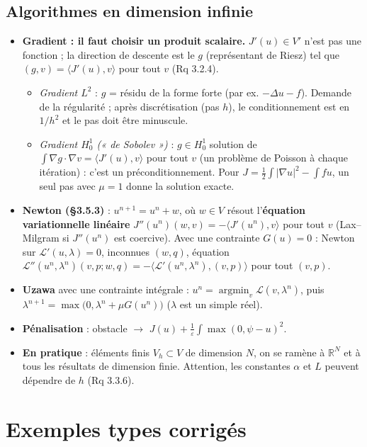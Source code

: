 \documentclass[10pt,a4paper]{article}
\newcommand{\R}{\mathbb{R}}
\newcommand{\sca}[2]{\langle #1,#2\rangle}
\newcommand{\eps}{\varepsilon}
\newcommand{\Lg}{\mathcal{L}}
\begin{document}
\subsection{Algorithmes en dimension infinie}\label{sec:algo}
\begin{itemize}
\item \textbf{Gradient : il faut choisir un produit scalaire.} $J'(u)\in V'$ n'est pas une fonction ; la direction de descente est le $g$ (représentant de Riesz) tel que $(g,v)=\sca{J'(u)}v$ pour tout $v$ (Rq 3.2.4).
\begin{itemize}
\item \emph{Gradient $L^2$} : $g$ = résidu de la forme forte (par ex. $-\Delta u-f$). Demande de la régularité ; après discrétisation (pas $h$), le conditionnement est en $1/h^2$ et le pas doit être minuscule.
\item \emph{Gradient $H^1_0$ (« de Sobolev »)} : $g\in H^1_0$ solution de $\int\nabla g\cdot\nabla v=\sca{J'(u)}v$ pour tout $v$ (un problème de Poisson à chaque itération) : c'est un préconditionnement. Pour $J=\frac12\int|\nabla u|^2-\int fu$, un seul pas avec $\mu=1$ donne la solution exacte.
\end{itemize}
\item \textbf{Newton (§3.5.3)} : $u^{n+1}=u^n+w$, où $w\in V$ résout l'\textbf{équation variationnelle linéaire}
$J''(u^n)(w,v)=-\sca{J'(u^n)}v$ pour tout $v$ (Lax--Milgram si $J''(u^n)$ est coercive). Avec une contrainte $G(u)=0$ : Newton sur $\Lg'(u,\lambda)=0$, inconnues $(w,q)$, équation $\Lg''(u^n,\lambda^n)(v,p;w,q)=-\sca{\Lg'(u^n,\lambda^n)}{(v,p)}$ pour tout $(v,p)$.
\item \textbf{Uzawa} avec une contrainte intégrale : $u^n=\operatorname{argmin}_v\Lg(v,\lambda^n)$, puis $\lambda^{n+1}=\max\big(0,\lambda^n+\mu G(u^n)\big)$ ($\lambda$ est un simple réel).
\item \textbf{Pénalisation} : obstacle $\to$ $J(u)+\frac1\eps\int\max(0,\psi-u)^2$.
\item \textbf{En pratique} : éléments finis $V_h\subset V$ de dimension $N$, on se ramène à $\R^N$ et à tous les résultats de dimension finie. Attention, les constantes $\alpha$ et $L$ peuvent dépendre de $h$ (Rq 3.3.6).
\end{itemize}

\section{Exemples types corrigés}
\end{document}
